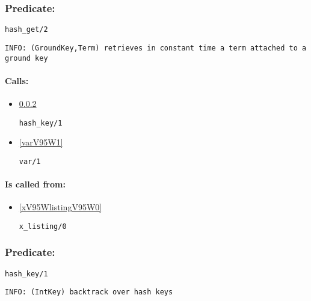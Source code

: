 \subsubsection{Predicate:} \label{hashV95WgetV95W2}

\begin{verbatim}
hash_get/2
\end{verbatim}

{\small \begin{verbatim}
INFO: (GroundKey,Term) retrieves in constant time a term attached to a ground key

\end{verbatim}}
\paragraph{Calls:} 
\begin{itemize}
\item \ref{hashV95WkeyV95W1} 
\begin{verbatim}
hash_key/1
\end{verbatim}

\item \ref{varV95W1} 
\begin{verbatim}
var/1
\end{verbatim}

\end{itemize}
\paragraph{Is called from:} 
\begin{itemize}
\item \ref{xV95WlistingV95W0} 
\begin{verbatim}
x_listing/0
\end{verbatim}

\end{itemize}

\subsubsection{Predicate:} \label{hashV95WkeyV95W1}

\begin{verbatim}
hash_key/1
\end{verbatim}

{\small \begin{verbatim}
INFO: (IntKey) backtrack over hash keys

\end{verbatim}}
